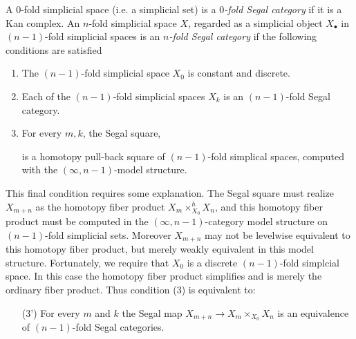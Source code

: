 \documentclass{amsart}
\begin{document}
\begin{definition}
	A $0$-fold simplicial space (i.e. a simplicial set) is a {\em $0$-fold Segal category} if it is a Kan complex. An $n$-fold simplicial space $X$, regarded as a simplicial object $X_\bullet$ in $(n-1)$-fold simplicial spaces is an {\em $n$-fold Segal category} if the following conditions are satisfied
		\begin{enumerate}
			\item The $(n-1)$-fold simplicial space $X_0$ is constant and discrete.
			\item Each of the $(n-1)$-fold simplicial spaces $X_k$ is an $(n-1)$-fold Segal category.
			\item For every $m, k$, the Segal square,
			\begin{center}
			\end{center}
			is a homotopy pull-back square of $(n-1)$-fold simplical spaces, computed with the $(\infty, n-1)$-model structure.
		\end{enumerate}
	\end{definition}
This final condition requires some explanation. The Segal square must realize $X_{m+n}$ as the homotopy fiber product $X_m \times_{X_0}^h X_n$, and this homotopy fiber product must be computed in the $(\infty, n-1)$-category model structure on $(n-1)$-fold simplicial sets. Moreover $X_{m+n}$ may not be levelwise equivalent to this homotopy fiber product, but merely weakly equivalent in this model structure. Fortunately, we require that $X_0$ is a discrete $(n-1)$-fold simplcial space. In this case the homotopy fiber product simplifies and is merely the ordinary fiber product. Thus condition (3) is equivalent to:

\begin{enumerate}
	\item [(3')] For every $m$ and $k$ the Segal map $X_{m+n} \to X_m \times_{X_0} X_n$ is an equivalence of $(n-1)$-fold Segal categories. 
\end{enumerate}
\end{document}
